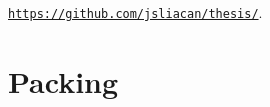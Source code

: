 \documentclass[12pt, a4paper, twoside]{report}
\begin{document}
\begin{center}\href{https://github.com/jsliacan/thesis}{\texttt{https://github.com/jsliacan/thesis/}}.\end{center}

\part{Packing}
\label{part:packing}

%

%

{}

 
\end{document}
